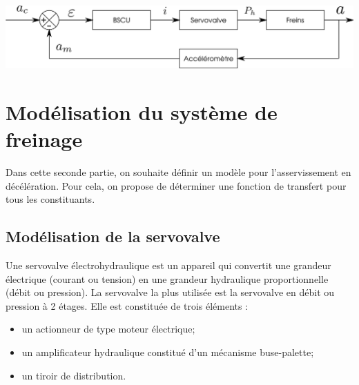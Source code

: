 \documentclass[10pt,fleqn]{article} %
\begin{document}
\begin{multicols}{2}
\ifprof
\begin{corrige}
\begin{center}
 \includegraphics[width=.8\linewidth]{images/blocs}
\end{center}
\end{corrige}
\else
\fi


\section*{Modélisation du système de freinage}

Dans cette seconde partie, on souhaite définir un modèle pour l'asservissement en décélération. Pour cela, on propose de déterminer une fonction de transfert pour tous les constituants.




\subsection*{Modélisation de la servovalve}
\ifprof
\else

Une servovalve électrohydraulique est un appareil qui convertit une grandeur électrique (courant ou tension) en une grandeur hydraulique proportionnelle (débit ou pression).
La servovalve la plus utilisée est la servovalve en débit ou pression à 2 étages. Elle est constituée de trois éléments :
\begin{itemize}
\item un actionneur de type moteur électrique;
\item un amplificateur hydraulique constitué d’un mécanisme buse-palette;
\item un tiroir de distribution.
\end{itemize}


\end{multicols}
\end{document}
